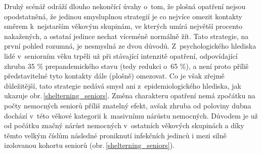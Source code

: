 Druhý scénář odráží dlouho nekončící úvahy o~tom, že plošná opatření nejsou opodstatněná, že jedinou smysluplnou strategií je co nejvíce omezit kontakty směrem k~nejstarším věkovým skupinám, ve kterých umírá největší procento nakažených, a ostatní jedince nechat víceméně normálně žít. Tato strategie, na první pohled rozumná, je nesmyslná ze dvou důvodů. Z~psychologického hlediska lidé v~seniorním věku trpěli už při stávající intenzitě opatření, odpovídající zhruba 35 \% prepandemického stavu (tedy redukci o~65 \%), a není proto příliš představitelné tyto kontakty dále (plošně) omezovat. Co je však zřejmě důležitější, tato strategie nedává smysl ani z~epidemiologického hlediska, jak ukazuje obr.\,\ref{shelterning_seniors}. Změna charakteru opatření nemá zpočátku na počty nemocných seniorů příliš znatelný efekt, avšak zhruba od poloviny dubna dochází v~této věkové kategorii k~masivnímu nárůstu nemocných. Důvodem je už od počátku značný nárůst nemocných v~ostatních věkových skupinách a díky těmto velkým číslům následné proniknutí infekčních jedinců i mezi silně izolovanou kohortu seniorů (obr.\,\ref{shelterning_seniors}).

